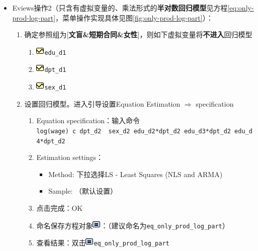 \documentclass[12pt,(landscape,a4paper),(portrait,a4paper)]{article}
\providecommand{\tightlist}{%
  \setlength{\itemsep}{0pt}\setlength{\parskip}{0pt}}
\theoremstyle{definition}
\theoremstyle{definition}
\theoremstyle{definition}
\theoremstyle{remark}
\begin{document}
\begin{itemize}
\tightlist
\item
  Eviews操作2（只含有虚拟变量的、乘法形式的\textbf{半对数回归模型}见方程\eqref{eq:only-prod-log-part}，菜单操作实现具体见图\ref{fig:only-prod-log-part}）：

  \begin{enumerate}
  \def\labelenumi{\arabic{enumi})}
  \tightlist
  \item
    确定参照组为{[}\textbf{文盲\&短期合同\&女性}{]}，则如下虚拟变量将\textbf{不进入}回归模型

    \begin{enumerate}
    \def\labelenumii{\alph{enumii}.}
    \tightlist
    \item
      \includegraphics{picture/object/Series.png}\texttt{edu\_d1}
    \item
      \includegraphics{picture/object/Series.png}\texttt{dpt\_d1}
    \item
      \includegraphics{picture/object/Series.png}\texttt{sex\_d1}
    \end{enumerate}
  \item
    设置回归模型。进入引导设置Equation Estimation \(\Rightarrow\)
    specification

    \begin{enumerate}
    \def\labelenumii{\alph{enumii}.}
    \tightlist
    \item
      Equation
      specification：输入命令\texttt{log(wage)\ c\ dpt\_d2\ \ sex\_d2\ edu\_d2*dpt\_d2\ edu\_d3*dpt\_d2\ edu\_d4*dpt\_d2}
    \item
      Estimation settings：

      \begin{itemize}
      \tightlist
      \item
        Method: 下拉选择LS - Least Squares (NLS and ARMA)
      \item
        Sample: （默认设置）
      \end{itemize}
    \item
      点击完成：OK
    \item
      命名保存方程对象\includegraphics{picture/object/Equation.png}：（建议命名为\texttt{eq\_only\_prod\_log\_part}）
    \item
      查看结果：双击\includegraphics{picture/object/Equation.png}\texttt{eq\_only\_prod\_log\_part}
    \end{enumerate}
  \end{enumerate}
\end{itemize}
\end{document}
